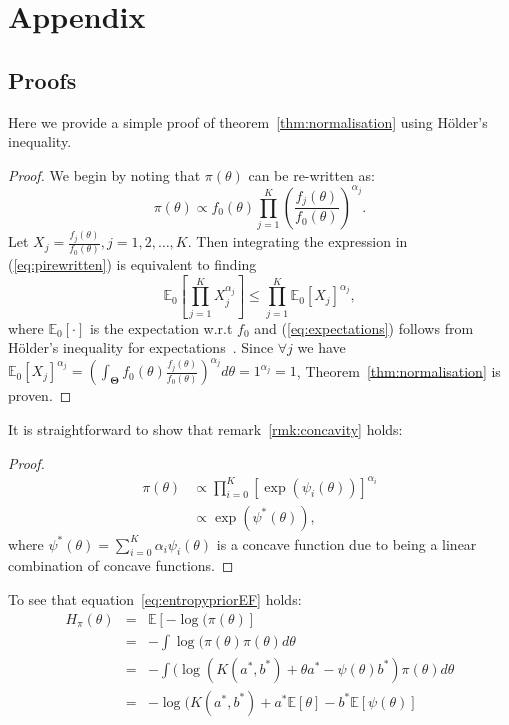 \documentclass[a4paper, notitlepage, 10pt]{article}
\begin{document}
\newpage 

\section{Appendix}

\subsection{Proofs}

Here we provide a simple proof of theorem~\ref{thm:normalisation} using H\"{o}lder's inequality.
\begin{proof}
We begin by noting that $\pi(\theta)$ can be re-written as:
\begin{equation}
\label{eq:pirewritten}
 \pi(\theta) \propto f_0(\theta)\prod_{j=1}^{K} \left(\frac{f_j(\theta)}{f_0(\theta)}\right)^{\alpha_j}.
\end{equation}
Let $X_j = \frac{f_j(\theta)}{f_0(\theta)}, j=1, 2,\ldots, K$. 
Then integrating the expression in (\ref{eq:pirewritten}) is equivalent to finding 
\begin{equation}
\label{eq:expectations}
\mathbb{E}_{0}\left[\prod_{j=1}^KX_j^{\alpha_j}\right] \leq \prod_{j=1}^K \mathbb{E}_{0}[X_j]^{\alpha_j},
\end{equation}
where $\mathbb{E}_{0}[\cdot]$ is the expectation w.r.t $f_0$ and (\ref{eq:expectations}) follows from H\"{o}lder's inequality for expectations~\citep{yeh2011}.
Since $\forall j$ we have $\mathbb{E}_{0}[X_j]^{\alpha_j} = \left(\int_{\boldsymbol\Theta}f_0(\theta)\frac{f_j(\theta)}{f_0(\theta)}\right)^{\alpha_j}d\theta=1^{\alpha_j}=1$, Theorem~\ref{thm:normalisation} is proven.
\end{proof}
It is straightforward to show that remark~\ref{rmk:concavity} holds:
\begin{proof}
\begin{align}
 \pi(\theta) &\propto \prod_{i=0}^{K} [\exp(\psi_i(\theta))]^{\alpha_i}\\
             &\propto \exp(\psi^{\ast}(\theta)),
\end{align}
 where $\psi^{\ast}(\theta) = \sum_{i=0}^{K}\alpha_i\psi_i(\theta)$ is a concave function due to being a linear combination of concave functions.
\end{proof}
To see that equation~\ref{eq:entropypriorEF} holds:
\begin{eqnarray*} 
H_\pi(\theta) & = & \mathbb{E}[-\log(\pi(\theta)] \\
              & = & - \int \log(\pi(\theta) \pi(\theta) d\theta \\
              & = & - \int (\log(K(a^*, b^*) + \theta a^* - \psi(\theta) b^*) \pi(\theta) d\theta \\
              & = & - \log(K(a^*, b^*) + a^*  \mathbb{E}[\theta]-  b^*  \mathbb{E}[\psi(\theta)]
\end{eqnarray*}
\end{document}
